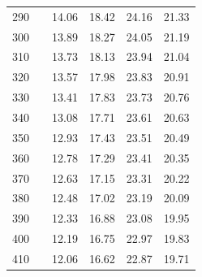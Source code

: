 \documentclass[12pt,a4paper]{article}
\begin{document}
\begin{enumerate}
\begin{longtable}{|c|c|c|c|c|c|}
290 &  & 14.06 & 18.42 & 24.16 & 21.33 \\ 
300 &  & 13.89 & 18.27 & 24.05 & 21.19 \\ 
310 &  & 13.73 & 18.13 & 23.94 & 21.04 \\ 
320 &  & 13.57 & 17.98 & 23.83 & 20.91 \\ 
330 &  & 13.41 & 17.83 & 23.73 & 20.76 \\ 
340 &  & 13.08 & 17.71 & 23.61 & 20.63 \\ 
350 &  & 12.93 & 17.43 & 23.51 & 20.49 \\ 
360 &  & 12.78 & 17.29 & 23.41 & 20.35 \\ 
370 &  & 12.63 & 17.15 & 23.31 & 20.22 \\ 
380 &  & 12.48 & 17.02 & 23.19 & 20.09 \\ 
390 &  & 12.33 & 16.88 & 23.08 & 19.95 \\ 
400 &  & 12.19 & 16.75 & 22.97 & 19.83 \\ 
410 &  & 12.06 & 16.62 & 22.87 & 19.71 \\ \hline
			\end{longtable}
	

\end{enumerate}
\end{document}
